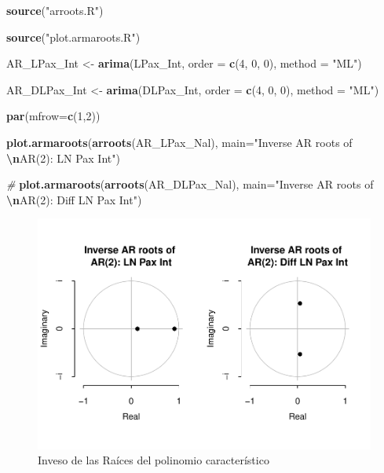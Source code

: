 \documentclass[
]{book}
\newenvironment{Shaded}{\begin{snugshade}}{\end{snugshade}}
\newcommand{\AttributeTok}[1]{\textcolor[rgb]{0.13,0.29,0.53}{#1}}
\newcommand{\CommentTok}[1]{\textcolor[rgb]{0.56,0.35,0.01}{\textit{#1}}}
\newcommand{\DecValTok}[1]{\textcolor[rgb]{0.00,0.00,0.81}{#1}}
\newcommand{\FunctionTok}[1]{\textcolor[rgb]{0.13,0.29,0.53}{\textbf{#1}}}
\newcommand{\NormalTok}[1]{#1}
\newcommand{\OtherTok}[1]{\textcolor[rgb]{0.56,0.35,0.01}{#1}}
\newcommand{\SpecialCharTok}[1]{\textcolor[rgb]{0.81,0.36,0.00}{\textbf{#1}}}
\newcommand{\StringTok}[1]{\textcolor[rgb]{0.31,0.60,0.02}{#1}}
\begin{document}
\begin{Shaded}
\begin{Highlighting}[]
\FunctionTok{source}\NormalTok{(}\StringTok{"arroots.R"}\NormalTok{)}

\FunctionTok{source}\NormalTok{(}\StringTok{"plot.armaroots.R"}\NormalTok{)}

\NormalTok{AR\_LPax\_Int }\OtherTok{\textless{}{-}} \FunctionTok{arima}\NormalTok{(LPax\_Int, }\AttributeTok{order =} \FunctionTok{c}\NormalTok{(}\DecValTok{4}\NormalTok{, }\DecValTok{0}\NormalTok{, }\DecValTok{0}\NormalTok{), }
                     \AttributeTok{method =} \StringTok{"ML"}\NormalTok{)}

\NormalTok{AR\_DLPax\_Int }\OtherTok{\textless{}{-}} \FunctionTok{arima}\NormalTok{(DLPax\_Int, }\AttributeTok{order =} \FunctionTok{c}\NormalTok{(}\DecValTok{4}\NormalTok{, }\DecValTok{0}\NormalTok{, }\DecValTok{0}\NormalTok{), }
                      \AttributeTok{method =} \StringTok{"ML"}\NormalTok{)}

\FunctionTok{par}\NormalTok{(}\AttributeTok{mfrow=}\FunctionTok{c}\NormalTok{(}\DecValTok{1}\NormalTok{,}\DecValTok{2}\NormalTok{))}

\FunctionTok{plot.armaroots}\NormalTok{(}\FunctionTok{arroots}\NormalTok{(AR\_LPax\_Nal), }
               \AttributeTok{main=}\StringTok{"Inverse AR roots of }\SpecialCharTok{\textbackslash{}n}\StringTok{AR(2): LN Pax Int"}\NormalTok{)}

\CommentTok{\#}
\FunctionTok{plot.armaroots}\NormalTok{(}\FunctionTok{arroots}\NormalTok{(AR\_DLPax\_Nal), }
               \AttributeTok{main=}\StringTok{"Inverse AR roots of }\SpecialCharTok{\textbackslash{}n}\StringTok{AR(2): Diff LN Pax Int"}\NormalTok{)}
\end{Highlighting}
\end{Shaded}

\begin{figure}

{\centering \includegraphics{Notas-Series-Tiempo_files/figure-latex/fig410-1} 

}

\caption{Inveso de las Raíces del polinomio característico}\label{fig:fig410}
\end{figure}
\end{document}
